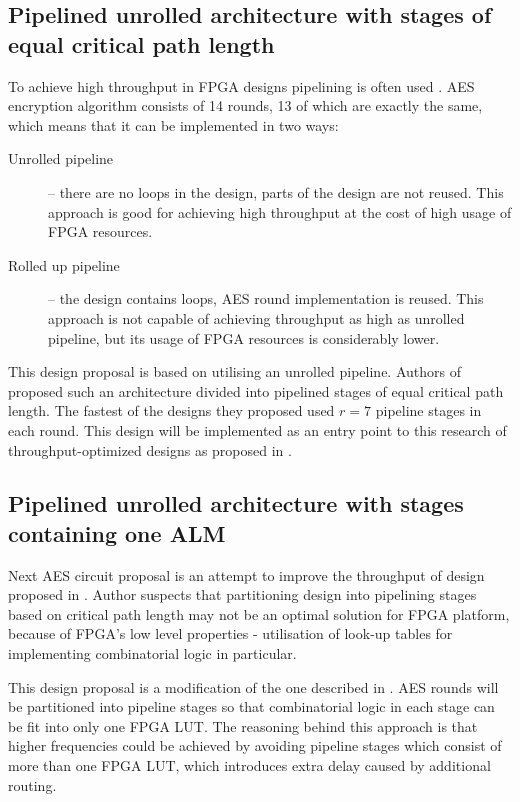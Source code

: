 \subsection{Pipelined unrolled architecture with stages of equal critical path length}
To achieve high throughput in FPGA designs pipelining is often used \cite[Chapter 1]{kilts2007advanced}. AES encryption algorithm consists of 14 rounds, 13 of which are exactly the same, which means that it can be implemented in two ways:
\begin{description}
\item[Unrolled pipeline] -- there are no loops in the design, parts of the design are not reused. This approach is good for achieving high throughput at the cost of high usage of FPGA resources.
\item[Rolled up pipeline] -- the design contains loops, AES round implementation is reused. This approach is not capable of achieving throughput as high as unrolled pipeline, but its usage of FPGA resources is considerably lower.
\end{description}

This design proposal is based on utilising an unrolled pipeline. Authors of \cite{vlsi} proposed such an architecture divided into pipelined stages of equal critical path length. The fastest of the designs they proposed \cite[Fig. 11]{vlsi} used $r=7$ pipeline stages in each round. This design will be implemented as an entry point to this research of throughput-optimized designs as proposed in \cite{vlsi}.


\subsection{Pipelined unrolled architecture with stages containing one ALM}
\label{sec:unrolled-one-alm}
Next AES circuit proposal is an attempt to improve the throughput of design proposed in \cite{vlsi}. Author suspects that partitioning design into pipelining stages based on critical path length may not be an optimal solution for FPGA platform, because of FPGA's low level properties - utilisation of look-up tables for implementing combinatorial logic in particular.

This design proposal is a modification of the one described in \cite{vlsi}. AES rounds will be partitioned into pipeline stages so that combinatorial logic in each stage can be fit into only one FPGA LUT. The reasoning behind this approach is that higher frequencies could be achieved by avoiding pipeline stages which consist of more than one FPGA LUT, which introduces extra delay caused by additional routing.

